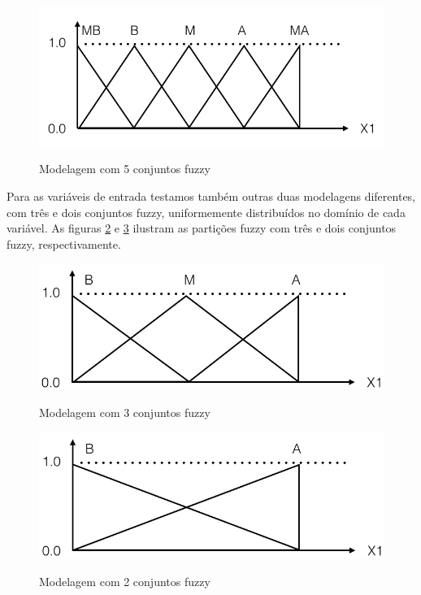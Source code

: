 \documentclass[template.tex]{subfiles}
\begin{document}
\begin{figure}[H]
\caption{Modelagem com 5 conjuntos fuzzy}
\centering
\includegraphics[scale=0.45]{cinco_conjuntos_fuzzy.png}
\label{figura:cinco_conjuntos_fuzzy}
\end{figure}

Para as variáveis de entrada testamos também outras duas modelagens diferentes, com três e dois conjuntos fuzzy, uniformemente distribuídos no domínio de cada variável. As figuras \ref{figura:tres_conjuntos_fuzzy} e \ref{figura:conjuntos_fuzzy_entrada_final} ilustram as partições fuzzy com três e dois conjuntos fuzzy, respectivamente.

\begin{figure}[H]
\caption{Modelagem com 3 conjuntos fuzzy}
\centering
\includegraphics[scale=0.45]{tres_conjuntos_fuzzy.png}
\label{figura:tres_conjuntos_fuzzy}
\end{figure}

\begin{figure}[H]
\caption{Modelagem com 2 conjuntos fuzzy}
\centering
\includegraphics[scale=0.45]{conjuntos_fuzzy_entrada_final.png}
\label{figura:conjuntos_fuzzy_entrada_final}
\end{figure}
\end{document}
